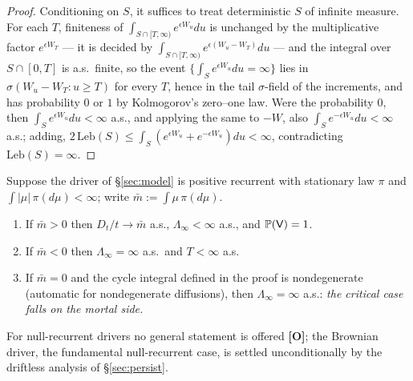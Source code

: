 \begin{proof}
Conditioning on $S$, it suffices to treat deterministic $S$ of
infinite measure. For each $T$, finiteness of
$\int_{S\cap[T,\infty)}e^{\epsilon W_u}du$ is unchanged by the
multiplicative factor $e^{\epsilon W_T}$ --- it is decided by
$\int_{S\cap[T,\infty)}e^{\epsilon(W_u-W_T)}du$ --- and the integral
over $S\cap[0,T]$ is a.s.\ finite, so the event
$\{\int_Se^{\epsilon W_u}du=\infty\}$ lies in
$\sigma(W_u-W_T:u\ge T)$ for every $T$, hence in the tail
$\sigma$-field of the increments, and has probability $0$ or $1$ by
Kolmogorov's zero--one law. Were the probability $0$, then
$\int_Se^{\epsilon W_u}du<\infty$ a.s., and applying the same to $-W$,
also $\int_Se^{-\epsilon W_u}du<\infty$ a.s.; adding,
$2\,\mathrm{Leb}(S)\le\int_S(e^{\epsilon W_u}+e^{-\epsilon W_u})du
<\infty$, contradicting $\mathrm{Leb}(S)=\infty$.
\end{proof}

\begin{proposition}\label{prop:recurrent}
Suppose the driver of \S\ref{sec:model} is positive recurrent with
stationary law $\pi$ and $\int|\mu|\,\pi(d\mu)<\infty$; write
$\bar m:=\int\mu\,\pi(d\mu)$.
\begin{enumerate}[label=\emph{(\alph*)},itemsep=1pt]
\item If $\bar m>0$ then $D_t/t\to\bar m$ a.s., $\Lambda_\infty<\infty$
a.s., and $\mathbb{P}(\mathsf{V})=1$.
\item If $\bar m<0$ then $\Lambda_\infty=\infty$ a.s.\ and $T<\infty$ a.s.
\item If $\bar m=0$ and the cycle integral defined in the proof is
nondegenerate (automatic for nondegenerate diffusions), then
$\Lambda_\infty=\infty$ a.s.: \emph{the critical case falls on the mortal
side.}
\end{enumerate}
For null-recurrent drivers no general statement is offered
\textbf{[O]}; the Brownian driver, the fundamental null-recurrent case, is
settled unconditionally by the driftless analysis of \S\ref{sec:persist}.
\end{proposition}

